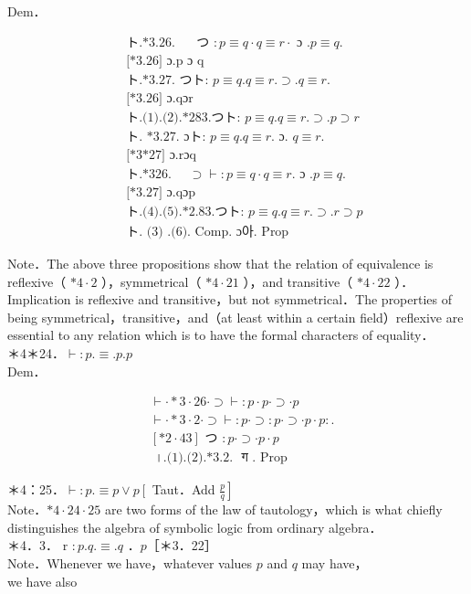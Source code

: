 \documentclass[10pt]{article}
\begin{document}
Dem．


\begin{align*}
& \text { ト.*3.26. } \quad \text { つ }: p \equiv q \cdot q \equiv r \cdot \text { ɔ } . p \equiv q \text {. } \\
& \text { [*3.26] ɔ.p ɔ q }  \tag{1}\\
& \text { ト.*3.27. つト: } p \equiv q . q \equiv r . \supset . q \equiv r \text {. } \\
& \text { [*3.26] ɔ.qɔr }  \tag{2}\\
& \text { ト.(1).(2).*283.つト: } p \equiv q . q \equiv r . \supset . p \supset r  \tag{3}\\
& \text { ト. *3.27. ɔト: } p \equiv q . q \equiv r . \text { ɔ. } q \equiv r \text {. } \\
& \text { [*3*27] ɔ.rɔq }  \tag{4}\\
& \text { ト.*326. } \quad \supset \vdash: p \equiv q \cdot q \equiv r \text {. ɔ } . p \equiv q \text {. } \\
& \text { [*3.27] ɔ.qɔp }  \tag{5}\\
& \text { ト.(4).(5).*2.83.つト: } p \equiv q . q \equiv r . \supset . r \supset p  \tag{6}\\
& \text { ト. (3) .(6). Comp. ɔ아. Prop }
\end{align*}


Note．The above three propositions show that the relation of equivalence is reflexive（ $* 4 \cdot 2$ ），symmetrical（ $* 4 \cdot 21$ ），and transitive（ $* 4 \cdot 22$ ）．Implication is reflexive and transitive，but not symmetrical．The properties of being symmetrical，transitive，and（at least within a certain field）reflexive are essential to any relation which is to have the formal characters of equality．\\
＊4＊24．$\vdash: p . \equiv . p . p$\\
Dem．


\begin{align*}
& \vdash \cdot * 3 \cdot 26 \cdot \supset \vdash: p \cdot p \cdot \supset \cdot p  \tag{1}\\
& \vdash \cdot * 3 \cdot 2 \cdot \supset \vdash: p \cdot \supset: p \cdot \supset \cdot p \cdot p: . \\
& {[* 2 \cdot 43] \text { つ }: p \cdot \supset \cdot p \cdot p}  \tag{2}\\
& \text { ।.(1).(2).*3.2. } \text { ग } \text {. Prop }
\end{align*}


＊4：25．$\vdash: p . \equiv p \vee p\left[\right.$ Taut．Add $\left.\frac{p}{q}\right]$\\
Note．$* 4 \cdot 24 \cdot 25$ are two forms of the law of tautology，which is what chiefly distinguishes the algebra of symbolic logic from ordinary algebra．\\
＊4．3． r $: p . q . \equiv . q$ ．$p$［＊3．22］\\
Note．Whenever we have，whatever values $p$ and $q$ may have，\\
we have also
\end{document}
